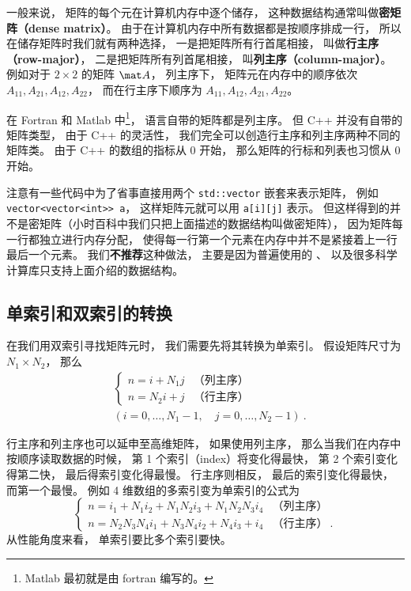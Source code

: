

一般来说， 矩阵的每个元在计算机内存中逐个储存， 这种数据结构通常叫做\textbf{密矩阵（dense matrix）}。 由于在计算机内存中所有数据都是按顺序排成一行， 所以在储存矩阵时我们就有两种选择， 一是把矩阵所有行首尾相接， 叫做\textbf{行主序（row-major）}， 二是把矩阵所有列首尾相接， 叫\textbf{列主序（column-major）}。 例如对于 $2 \times 2$ 的矩阵 $\mat A$， 列主序下， 矩阵元在内存中的顺序依次 $A_{11}, A_{21}, A_{12}, A_{22}$， 而在行主序下顺序为 $A_{11},A_{12},A_{21},A_{22}$。

在 Fortran 和 Matlab 中\footnote{Matlab 最初就是由 fortran 编写的。}， 语言自带的矩阵都是列主序。 但 C++ 并没有自带的矩阵类型， 由于 C++ 的灵活性， 我们完全可以创造行主序和列主序两种不同的矩阵类。 由于 C++ 的数组的指标从 0 开始， 那么矩阵的行标和列表也习惯从 0 开始。

注意有一些代码中为了省事直接用两个 \verb|std::vector| 嵌套来表示矩阵， 例如 \verb|vector<vector<int>> a|， 这样矩阵元就可以用 \verb|a[i][j]| 表示。 但这样得到的并不是密矩阵（小时百科中我们只把上面描述的数据结构叫做密矩阵）， 因为矩阵每一行都独立进行内存分配， 使得每一行第一个元素在内存中并不是紧接着上一行最后一个元素。 我们\textbf{不推荐}这种做法， 主要是因为普遍使用的 、  以及很多科学计算库只支持上面介绍的数据结构。

\subsection{单索引和双索引的转换}
在我们用双索引寻找矩阵元时， 我们需要先将其转换为单索引。 假设矩阵尺寸为 $N_1 \times N_2$， 那么
\begin{equation}
\begin{aligned}
&\begin{cases}
n = i + N_1 j  &\text{（列主序）}\\
n = N_2 i + j  &\text{（行主序）}
\end{cases}\\
&(i = 0, \dots, N_1-1,\quad j = 0, \dots, N_2-1)~.
\end{aligned}
\end{equation}

行主序和列主序也可以延申至高维矩阵， 如果使用列主序， 那么当我们在内存中按顺序读取数据的时候， 第 1 个索引（index）将变化得最快， 第 2 个索引变化得第二快， 最后得索引变化得最慢。 行主序则相反， 最后的索引变化得最快， 而第一个最慢。 例如 4 维数组的多索引变为单索引的公式为
\begin{equation}
\begin{cases}
n = i_1 + N_1 i_2 + N_1 N_2 i_3 + N_1 N_2 N_3 i_4  &\text{（列主序）}\\
n = N_2 N_3 N_4 i_1 + N_3 N_4 i_2 + N_4 i_3 + i_4  &\text{（行主序）} ~.
\end{cases}
\end{equation}
从性能角度来看， 单索引要比多个索引要快。

